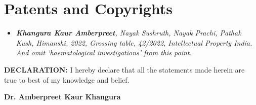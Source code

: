 \documentclass[11pt,a4paper,sans]{moderncv}        %
\begin{document}
\section{Patents and Copyrights}
\begin{itemize}
\item{\textbf{}} \textit{\textbf{Khangura Kaur Amberpreet}, Nayak Sushruth, Nayak Prachi, Pathak
Kush, Himanshi, 2022, Grossing table, 42/2022, Intellectual Property India. And omit
‘haematological investigations’ from this point.}
\end{itemize}


\vspace{300pt}
\textbf{DECLARATION:}
I hereby declare that all the statements made herein are true to best of my knowledge and
belief.

\textbf{Dr. Amberpreet Kaur Khangura}
\nocite{*}



\end{document}
